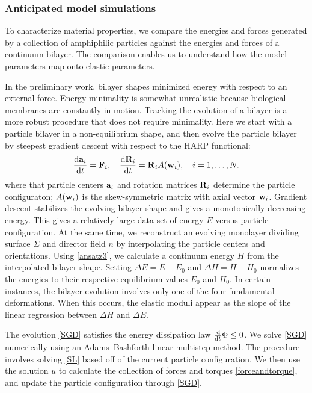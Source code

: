 \subsubsection{Anticipated model simulations}
To characterize material properties, we compare the energies and forces generated by
a collection of amphiphilic particles against the energies and forces of a continuum bilayer.
The comparison enables us to understand how the model parameters map onto elastic parameters. 

In the preliminary work, bilayer shapes minimized energy with respect to an external force. Energy minimality is somewhat unrealistic because
biological membranes are constantly in motion. Tracking the evolution of a bilayer is a more robust procedure that does not require minimality.
Here we start with a particle bilayer in a non-equilibrium shape, and then evolve the particle bilayer by steepest gradient descent with respect to the
HARP functional:
\begin{equation}
\label{SGD}   
\frac{\dif {\bf a}_i}{\dif t} = {\bf F}_i,    \quad  \frac{\dif {\bf R}_i}{\dif t}  = {\bf R}_i A({\bf w}_i),\quad i = 1, \dots, N.
\end{equation}
where that particle centers ${\bf a}_i$ and rotation matrices ${\bf R}_i$ determine the particle configuraton; 
$A({\bf w}_i)$ is the skew-symmetric matrix with axial vector ${\bf w}_i$.
Gradient descent stabilizes the evolving bilayer shape and gives a monotonically decreasing energy. This gives a relatively large
data set of energy $E$ versus particle configuration. At the same time, we reconstruct an evolving monolayer dividing surface $\Sigma$ and director field $n$ by
interpolating the particle centers and orientations. Using \eqref{ansatz3}, we calculate a continuum energy $H$ from the interpolated
bilayer shape. Setting $\Delta E = E - E_0$ and $\Delta H = H - H_0$ normalizes the energies to their respective equilibrium values $E_0$ and $H_0$.
In certain instances, the bilayer evolution involves only one of the four fundamental deformations.
When this occurs, the elastic moduli appear as the slope of the linear regression between $\Delta H$ and $\Delta E$. 

The evolution \eqref{SGD} satisfies the energy dissipation law $\frac{\dif }{\dif t} \Phi \leq 0$. We solve \eqref{SGD} numerically 
using an Adams–Bashforth linear multistep method. The procedure involves solving \eqref{SL} based off of the current particle configuration.
We then use the solution $u$ to calculate the collection of forces and torques \eqref{forceandtorque}, and update the particle configuration
through \eqref{SGD}. 

